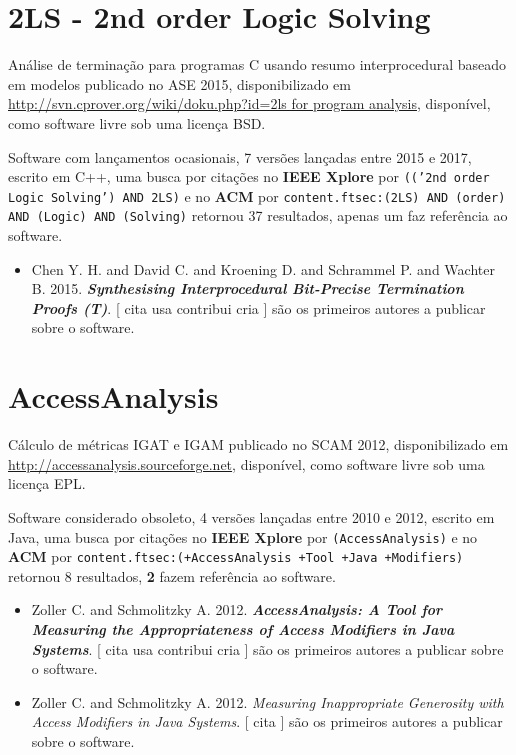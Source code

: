 
%

\label{softwares-summary}

\section{2LS - 2nd order Logic Solving}

Análise de terminação para programas C usando resumo interprocedural baseado em modelos
publicado no ASE 2015,
disponibilizado em \url{http://svn.cprover.org/wiki/doku.php?id=2ls for program analysis},
disponível,
como software livre
sob uma licença BSD.

Software com lançamentos ocasionais,
7 versões lançadas
entre 2015 e 2017,
escrito em C++,
uma busca por citações no {\bf IEEE Xplore} por
\texttt{(('2nd order Logic Solving') AND 2LS)}
e no {\bf ACM} por
\texttt{content.ftsec:(2LS) AND (order) AND (Logic) AND (Solving)}
retornou
37 resultados,
apenas um faz referência ao software.

\begin{itemize}
\item Chen Y. H. and David C. and Kroening D. and Schrammel P. and Wachter B.
      2015.
        \textbf{\textit{ Synthesising Interprocedural Bit-Precise Termination Proofs (T)}}.
      [
          cita
          usa
          contribui
          cria
      ]
são os primeiros autores a publicar sobre o software.
\end{itemize}
\section{AccessAnalysis}

Cálculo de métricas IGAT e IGAM
publicado no SCAM 2012,
disponibilizado em \url{http://accessanalysis.sourceforge.net},
disponível,
como software livre
sob uma licença EPL.

Software considerado obsoleto,
4 versões lançadas
entre 2010 e 2012,
escrito em Java,
uma busca por citações no {\bf IEEE Xplore} por
\texttt{(AccessAnalysis)}
e no {\bf ACM} por
\texttt{content.ftsec:(+AccessAnalysis +Tool +Java +Modifiers)}
retornou
8 resultados,
{\bf 2} fazem referência ao software.

\begin{itemize}
\item Zoller C. and Schmolitzky A.
      2012.
        \textbf{\textit{ AccessAnalysis: A Tool for Measuring the Appropriateness of Access Modifiers in Java Systems}}.
      [
          cita
          usa
          contribui
          cria
      ]
são os primeiros autores a publicar sobre o software.
\item Zoller C. and Schmolitzky A.
      2012.
        \textit{ Measuring Inappropriate Generosity with Access Modifiers in Java Systems}.
      [
          cita
      ]
são os primeiros autores a publicar sobre o software.
\end{itemize}

